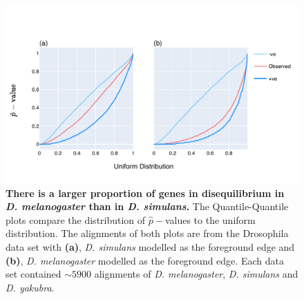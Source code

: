 \begin{figure}[htbp]
\centering
\includegraphics[width=	\textwidth]{figures/plots/drosophila/LRT-QQ.pdf}
\caption[There is a larger proportion of genes in disequilibrium in \textit{D. melanogaster} than in \textit{D. simulans}]{\textbf{There is a larger proportion of genes in disequilibrium in \textit{D. melanogaster} than in \textit{D. simulans}.} The Quantile-Quantile plots compare the distribution of $\hat p-$values to the uniform distribution. The alignments of both plots are from the Drosophila data set with \textbf{(a)}, \textit{D. simulans} modelled as the foreground edge and \textbf{(b)}, \textit{D. melanogaster} modelled as the foreground edge. Each data set contained $\sim 5900$ alignments of \textit{D. melanogaster}, \textit{D. simulans} and \textit{D. yakubra}. }
\label{fig:drosophila_lrt_qq}
\end{figure}
